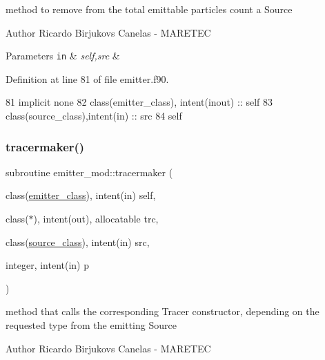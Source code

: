 method to remove from the total emittable particles count a Source 

\begin{DoxyAuthor}{Author}
Ricardo Birjukovs Canelas -\/ M\+A\+R\+E\+T\+EC 
\end{DoxyAuthor}

\begin{DoxyParams}[1]{Parameters}
\mbox{\tt in}  & {\em self,src} & \\
\hline
\end{DoxyParams}


Definition at line 81 of file emitter.\+f90.


\begin{DoxyCode}
81     \textcolor{keywordtype}{implicit none}
82     \textcolor{keywordtype}{class}(emitter\_class), \textcolor{keywordtype}{intent(inout)} :: self
83     \textcolor{keywordtype}{class}(source\_class),\textcolor{keywordtype}{intent(in)} :: src
84     self%
\end{DoxyCode}
\mbox{\label{namespaceemitter__mod_aee7b24637d2249727bccab333e062516}} 
\subsubsection{\texorpdfstring{tracermaker()}{tracermaker()}}
{\footnotesize\ttfamily subroutine emitter\+\_\+mod\+::tracermaker (\begin{DoxyParamCaption}\item[{class(\mbox{\hyperlink{structemitter__mod_1_1emitter__class}{emitter\+\_\+class}}), intent(in)}]{self,  }\item[{class($\ast$), intent(out), allocatable}]{trc,  }\item[{class(\mbox{\hyperlink{structsources__mod_1_1source__class}{source\+\_\+class}}), intent(in)}]{src,  }\item[{integer, intent(in)}]{p }\end{DoxyParamCaption})\hspace{0.3cm}{\ttfamily [private]}}



method that calls the corresponding Tracer constructor, depending on the requested type from the emitting Source 

\begin{DoxyAuthor}{Author}
Ricardo Birjukovs Canelas -\/ M\+A\+R\+E\+T\+EC 
\end{DoxyAuthor}

